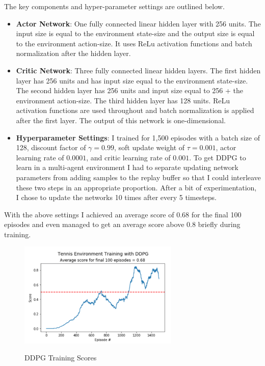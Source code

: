 \documentclass[sigchi]{acmart}
\begin{document}
The key components and hyper-parameter settings are outlined below.
\begin{itemize}
	\item \textbf{Actor Network}: One fully connected linear hidden layer with 256 units. The input size is equal to the environment state-size and the output size is equal to the environment action-size. It uses ReLu activation functions and batch normalization after the hidden layer.
	\item \textbf{Critic Network}: Three fully connected linear hidden layers. The first hidden layer has 256 units and has input size equal to the environment state-size. The second hidden layer has 256 units and input size equal to 256 + the environment action-size. The third hidden layer has 128 units. ReLu activation functions are used throughout  and batch normalization is applied after the first layer. The output of this network is one-dimensional.
	\item \textbf{Hyperparameter Settings}: 
	I trained for 1,500 episodes with a batch size of 128, discount factor of $\gamma = 0.99$, soft update weight of $\tau = 0.001$, actor learning rate of $0.0001$, 
	 and critic learning rate of $0.001$.  To get DDPG to learn in a multi-agent environment I had to separate updating network parameters from adding samples to the replay buffer so that I could interleave these two steps in an appropriate proportion. After a bit of experimentation, I chose to update the networks 10 times after every 5 timesteps. 
\end{itemize}

With the above settings I achieved an average score of 0.68 for the final 100 episodes and even managed to get an average score above 0.8 briefly during training.

\begin{figure}[h]
	\centering
	\includegraphics[width=3.0in]{ddpg-scores}
	\label{fig:ddpg-scores}
	\caption{DDPG Training Scores}
\end{figure}
\end{document}
